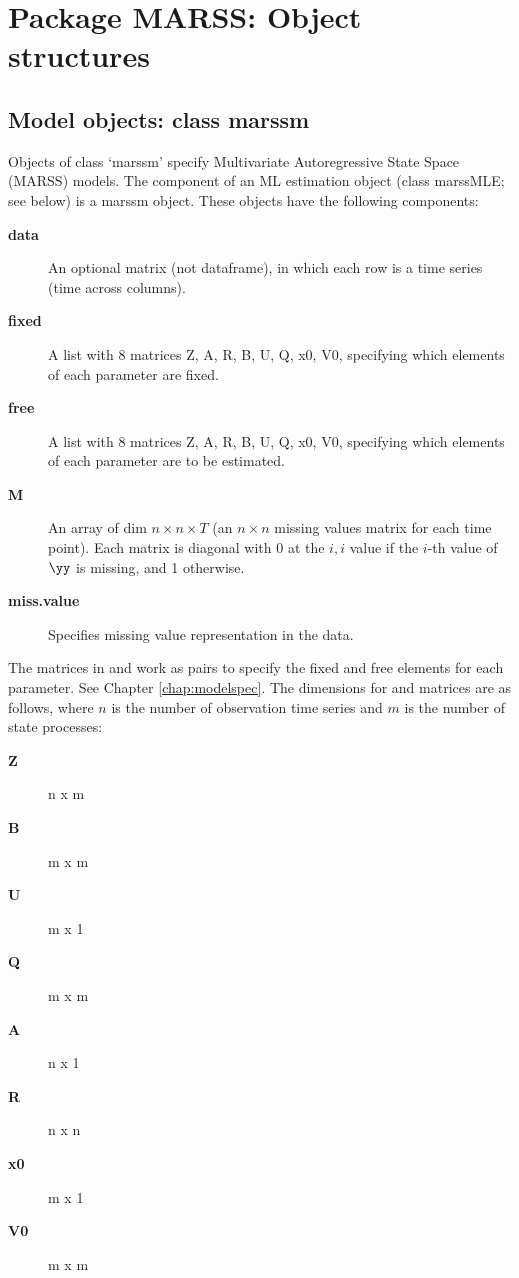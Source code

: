 \chapter{Package MARSS:  Object structures}

\section{Model objects: class marssm}
Objects of class `marssm' specify Multivariate Autoregressive State Space (MARSS) models. The \verb@model@ component of an ML estimation object (class marssMLE; see below) is a marssm object. These objects have the following components:

  \begin{description}
    \item[\textbf{data}]{ An optional matrix (not dataframe), in which each row is a time series (time across columns). }
    \item[\textbf{fixed}]{ A list with 8 matrices Z, A, R, B, U, Q, x0, V0, specifying which elements of each parameter are fixed. }
    \item[\textbf{free}]{ A list with 8 matrices Z, A, R, B, U, Q, x0, V0, specifying which elements of each parameter are to be estimated. }
    \item[\textbf{M}]{ An array of dim $n \times n \times T$ (an $n \times n$ missing values matrix for each time point).  Each matrix is diagonal with 0 at the $i,i$ value if the $i$-th value of $\yy$ is missing, and 1 otherwise.} 
    \item[\textbf{miss.value}]{ Specifies missing value representation in the data. }
  \end{description}

  The matrices in \verb@fixed@ and \verb@free@ work as pairs to specify the fixed and free elements for each parameter. See Chapter \ref{chap:modelspec}. The dimensions for \verb@fixed@ and \verb@free@ matrices are as follows, where $n$ is the number of observation time series and $m$ is the number of state processes:
  \begin{description}
    \item[\textbf{Z}]{ n x m }
    \item[\textbf{B}]{ m x m }
    \item[\textbf{U}]{ m x 1 }
    \item[\textbf{Q}]{ m x m }
    \item[\textbf{A}]{ n x 1 }
    \item[\textbf{R}]{ n x n }
    \item[\textbf{x0}]{ m x 1 }
    \item[\textbf{V0}]{ m x m }
  \end{description} 

